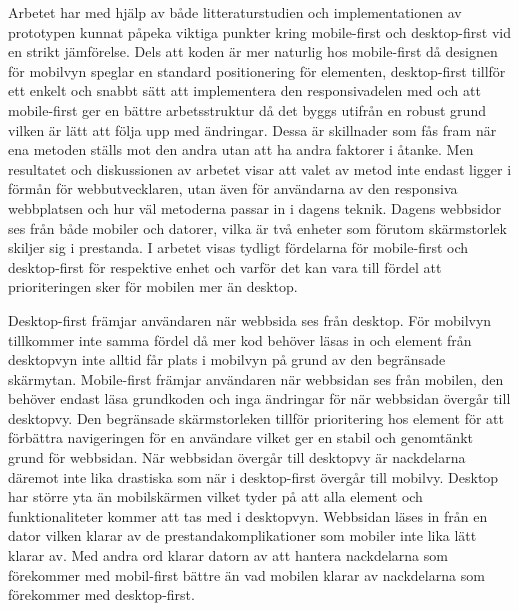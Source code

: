 \documentclass[11pt]{article}
\begin{document}
Arbetet har med hjälp av både litteraturstudien och implementationen av prototypen kunnat påpeka viktiga punkter kring mobile-first och desktop-first vid en strikt jämförelse. Dels att koden är mer naturlig hos mobile-first då designen för mobilvyn speglar en standard positionering för elementen, desktop-first tillför ett enkelt och snabbt sätt att implementera den responsivadelen med och att mobile-first ger en bättre arbetsstruktur då det byggs utifrån en robust grund vilken är lätt att följa upp med ändringar. Dessa är skillnader som fås fram när ena metoden ställs mot den andra utan att ha andra faktorer i åtanke. Men resultatet och diskussionen av arbetet visar att valet av metod inte endast ligger i förmån för webbutvecklaren, utan även för användarna av den responsiva webbplatsen och hur väl metoderna passar in i dagens teknik. Dagens webbsidor ses från både mobiler och datorer, vilka är två enheter som förutom skärmstorlek skiljer sig i prestanda. I arbetet visas tydligt fördelarna för mobile-first och desktop-first för respektive enhet och varför det kan vara till fördel att prioriteringen sker för mobilen mer än desktop.

Desktop-first främjar användaren när webbsida ses från desktop. För mobilvyn tillkommer inte samma fördel då mer kod behöver läsas in och element från desktopvyn inte alltid får plats i mobilvyn på grund av den begränsade skärmytan. Mobile-first främjar användaren när webbsidan ses från mobilen, den behöver endast läsa grundkoden och inga ändringar för när webbsidan övergår till desktopvy. Den begränsade skärmstorleken tillför prioritering hos element för att förbättra navigeringen för en användare vilket ger en stabil och genomtänkt grund för webbsidan. När webbsidan övergår till desktopvy är nackdelarna däremot inte lika drastiska som när i desktop-first övergår till mobilvy. Desktop har större yta än mobilskärmen vilket tyder på att alla element och funktionaliteter kommer att tas med i desktopvyn. Webbsidan läses in från en dator vilken klarar av de prestandakomplikationer som mobiler inte lika lätt klarar av. Med andra ord klarar datorn av att hantera nackdelarna som förekommer med mobil-first bättre än vad mobilen klarar av nackdelarna som förekommer med desktop-first.
\end{document}
